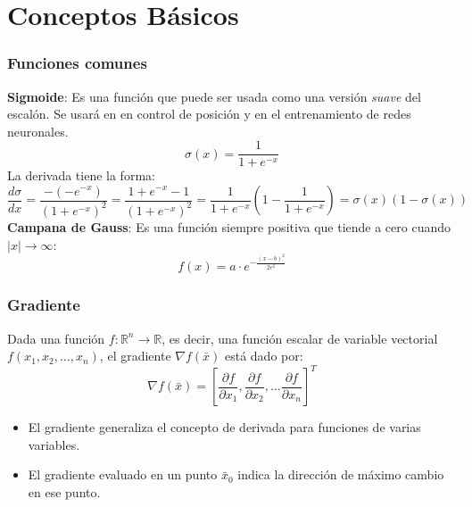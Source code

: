 \section{Conceptos Básicos}

\begin{frame}\frametitle{Funciones comunes}
  \textbf{Sigmoide}: Es una función que puede ser usada como una versión \textit{suave} del escalón. Se usará en en control de posición y en el entrenamiento de redes neuronales.
  \[\sigma(x) = \frac{1}{1 + e^{-x}}\]
  La derivada tiene la forma:
  \[\frac{d\sigma}{dx}=\frac{-(-e^{-x})}{\left(1 + e^{-x}\right)^2} = \frac{1 + e^{-x} - 1}{\left(1 + e^{-x}\right)^2}=\frac{1}{1+e^{-x}}\left(1 - \frac{1}{1 + e^{-x}}\right) = \sigma(x)(1 - \sigma(x))\]
  \textbf{Campana de Gauss}: Es una función siempre positiva que tiende a cero cuando $|x|\rightarrow \infty$:
  \[f(x) = a \cdot e^{-\frac{(x - b)^2}{2c^2}}\]
\end{frame}

\begin{frame}\frametitle{Gradiente}
  Dada una función $f:\mathbb{R}^n \rightarrow \mathbb{R}$, es decir, una función escalar de variable vectorial $f(x_1, x_2, \dots, x_n)$, el gradiente $\nabla f(\bar{x})$ está dado por:
  \[\nabla f(\bar{x}) = \left[ \frac{\partial f}{\partial x_1}, \frac{\partial f}{\partial x_2}, \dots \frac{\partial f}{\partial x_n}\right]^T\]

  \begin{itemize}
  \item El gradiente generaliza el concepto de derivada para funciones de varias variables.
  \item El gradiente evaluado en un punto $\bar{x}_0$ indica la dirección de máximo cambio en ese punto.
  \end{itemize}
\end{frame}

